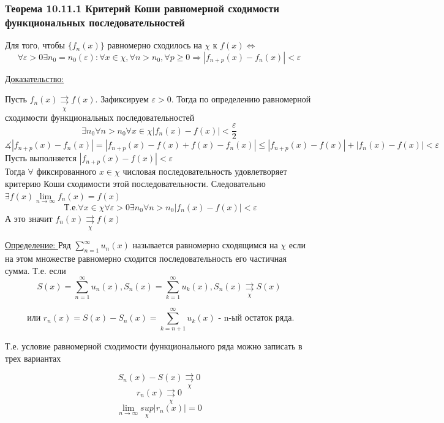 \documentclass[12pt]{article}
\newcommand*\circled[1]{\tikz[baseline=(char.base)]{
    \node[shape=circle, draw, inner sep=1pt, 
        minimum height=12pt] (char) {#1};}}
\let\oldsum\sum
\let\oldlim\lim
\renewcommand{\sum}{\oldsum\limits}
\renewcommand{\lim}{\oldlim\limits}
\begin{document}
  \subsubsection*{Теорема 10.11.1 Критерий Коши равномерной сходимости функциональных последовательностей}\label{th:10.11.1}
  \par\noindent
  Для того, чтобы $\{f_n(x)\}$ равномерно сходилось на $\chi$ к $f(x) \Leftrightarrow$
  \[\forall \varepsilon > 0 \exists n_0=n_0(\varepsilon): \forall x \in \chi, \forall n > n_0, \forall p \geq 0 \Rightarrow |f_{n+p}(x)-f_n(x)|< \varepsilon\]

  \underline{Доказательство:}
  \begin{adjustwidth}{1.5em}{1.5em}
    \circled{$\Rightarrow$} Пусть $f_n(x) \underset{\chi}{\rightrightarrows} f(x).$ Зафиксируем $\varepsilon>0$. Тогда
    по определению равномерной сходимости функциональных последовательностей
    \[\exists n_0 \forall n>n_0 \forall x \in \chi |f_n(x)-f(x)|<\frac{\varepsilon}{2}\]
    \[\measuredangle  |f_{n+p}(x)-f_n(x)| = |f_{n+p}(x)-f(x)+f(x)-f_n(x)|\leq |f_{n+p}(x)-f(x)|+|f_n(x)-f(x)| < \varepsilon\]
    \circled{$\Leftarrow$} Пусть выполняется $|f_{n+p}(x)-f(x)|<\varepsilon$\\
    Тогда $\forall$ фиксированного $x \in \chi$ числовая последовательность удовлетворяет критерию Коши сходимости
    этой последовательности. Следовательно $\exists f(x) \lim_{n \to \infty}f_n(x)=f(x)$\\
    \[\text{ Т.е.} \forall x \in \chi \forall \varepsilon > 0 \exists n_0 \forall n>n_0 |f_n(x)-f(x)|<\varepsilon\]
    А это значит $f_n(x) \underset{\chi}{\rightrightarrows} f(x)$
  \end{adjustwidth}

  \underline{Определение: } Ряд $\sum_{n=1}^{\infty} u_n(x)$ называется равномерно сходящимся на $\chi$ если на этом
  множестве равномерно сходится последовательность его частичная сумма. Т.е. если 
  \[S(x)=\sum_{n=1}^{\infty}u_n(x),S_n(x)=\sum_{k=1}^{\infty}u_k(x), S_n(x)\underset{\chi}{\rightrightarrows} S(x)\]

  \[\text{ или } r_n(x)=S(x)-S_n(x)=\sum_{k=n+1}^{\infty}u_k(x) \text{ - n-ый остаток ряда.}\]
  
  Т.е. условие равномерной сходимости функционального ряда можно записать в трех вариантах

  \[S_n(x)-S(x) \underset{\chi}{\rightrightarrows}0\]
  \[r_n(x)\underset{\chi}{\rightrightarrows} 0\]
  \[\lim_{n \to \infty} \underset{\chi}{sup}|r_n(x)|=0\]
\end{document}
